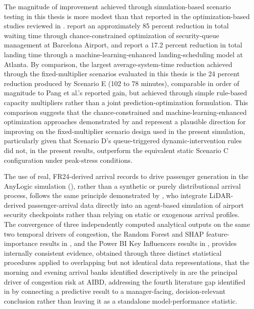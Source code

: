 The magnitude of improvement achieved through simulation-based scenario testing in this thesis is more modest than that reported in the optimization-based studies reviewed in . \textcite{cao2025robust} report an approximately 85 percent reduction in total waiting time through chance-constrained optimization of security-queue management at Barcelona Airport, and \textcite{pang2024machine} report a 17.2 percent reduction in total landing time through a machine-learning-enhanced landing-scheduling model at Atlanta. By comparison, the largest average-system-time reduction achieved through the fixed-multiplier scenarios evaluated in this thesis is the 24 percent reduction produced by Scenario E (102 to 78 minutes), comparable in order of magnitude to Pang et al.’s reported gain, but achieved through simple rule-based capacity multipliers rather than a joint prediction-optimization formulation. This comparison suggests that the chance-constrained and machine-learning-enhanced optimization approaches demonstrated by \textcite{cao2025robust} and \textcite{pang2024machine} represent a plausible direction for improving on the fixed-multiplier scenario design used in the present simulation, particularly given that Scenario D’s queue-triggered dynamic-intervention rules did not, in the present results, outperform the equivalent static Scenario C configuration under peak-stress conditions.

The use of real, FR24-derived arrival records to drive passenger generation in the AnyLogic simulation (), rather than a synthetic or purely distributional arrival process, follows the same principle demonstrated by \textcite{sang2026integrating}, who integrate LiDAR-derived passenger-arrival data directly into an agent-based simulation of airport security checkpoints rather than relying on static or exogenous arrival profiles. The convergence of three independently computed analytical outputs on the same two temporal drivers of congestion, the Random Forest and SHAP feature-importance results in , and the Power BI Key Influencers results in , provides internally consistent evidence, obtained through three distinct statistical procedures applied to overlapping but not identical data representations, that the morning and evening arrival banks identified descriptively in  are the principal driver of congestion risk at AIBD, addressing the fourth literature gap identified in  by connecting a predictive result to a manager-facing, decision-relevant conclusion rather than leaving it as a standalone model-performance statistic.

